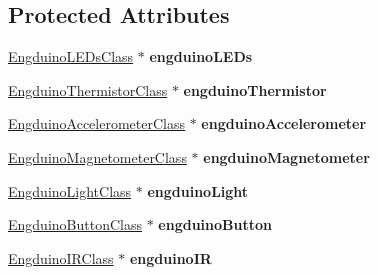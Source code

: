 \subsection*{Protected Attributes}
\begin{DoxyCompactItemize}
\item 
\hypertarget{class_engduino_protocol_class_ae06ac1a1ff252feb2ae473c6c4fe95a3}{}\hyperlink{class_engduino_l_e_ds_class}{Engduino\+L\+E\+Ds\+Class} $\ast$ {\bfseries engduino\+L\+E\+Ds}\label{class_engduino_protocol_class_ae06ac1a1ff252feb2ae473c6c4fe95a3}

\item 
\hypertarget{class_engduino_protocol_class_a0584004462e7501ca49b2dc4be77508b}{}\hyperlink{class_engduino_thermistor_class}{Engduino\+Thermistor\+Class} $\ast$ {\bfseries engduino\+Thermistor}\label{class_engduino_protocol_class_a0584004462e7501ca49b2dc4be77508b}

\item 
\hypertarget{class_engduino_protocol_class_a67132cca370b49bdf0815b42748f4841}{}\hyperlink{class_engduino_accelerometer_class}{Engduino\+Accelerometer\+Class} $\ast$ {\bfseries engduino\+Accelerometer}\label{class_engduino_protocol_class_a67132cca370b49bdf0815b42748f4841}

\item 
\hypertarget{class_engduino_protocol_class_ae0494dfe5a16238fd4ec2689880a7408}{}\hyperlink{class_engduino_magnetometer_class}{Engduino\+Magnetometer\+Class} $\ast$ {\bfseries engduino\+Magnetometer}\label{class_engduino_protocol_class_ae0494dfe5a16238fd4ec2689880a7408}

\item 
\hypertarget{class_engduino_protocol_class_a7d5cd7d8c682cdaab633ac47881531e5}{}\hyperlink{class_engduino_light_class}{Engduino\+Light\+Class} $\ast$ {\bfseries engduino\+Light}\label{class_engduino_protocol_class_a7d5cd7d8c682cdaab633ac47881531e5}

\item 
\hypertarget{class_engduino_protocol_class_aa934e66345dfaeddab03f3b20bc71fac}{}\hyperlink{class_engduino_button_class}{Engduino\+Button\+Class} $\ast$ {\bfseries engduino\+Button}\label{class_engduino_protocol_class_aa934e66345dfaeddab03f3b20bc71fac}

\item 
\hypertarget{class_engduino_protocol_class_a3e8e517b0ed2b39ec93907d759e25ebe}{}\hyperlink{class_engduino_i_r_class}{Engduino\+I\+R\+Class} $\ast$ {\bfseries engduino\+I\+R}\label{class_engduino_protocol_class_a3e8e517b0ed2b39ec93907d759e25ebe}

\end{DoxyCompactItemize}
